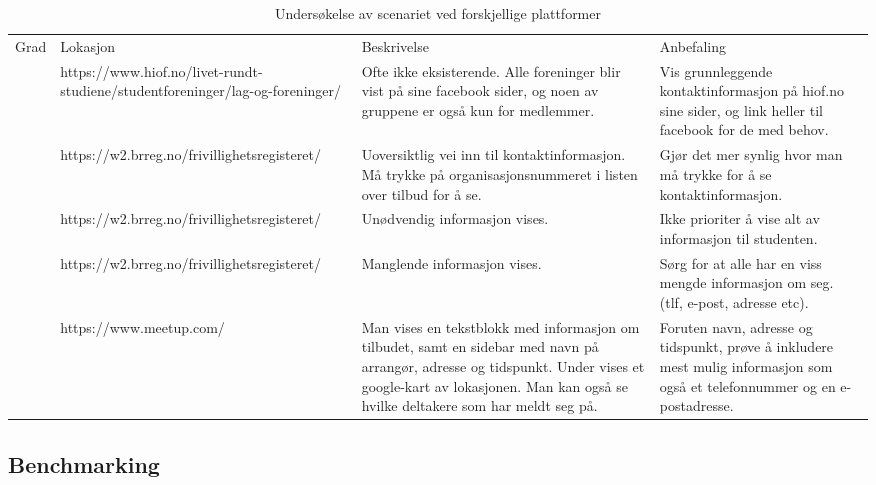 \begin{center}
\begin{table}[H]
\begin{tabular}{ | m{0.7cm} | m{4cm}| m{4cm} | m{4cm} | } 
 \hline
 \centering Grad & Lokasjon & Beskrivelse & Anbefaling \\

 \centering 4 & \tiny https://www.hiof.no/livet-rundt-studiene/studentforeninger/lag-og-foreninger/ & \tiny Ofte ikke eksisterende. Alle foreninger blir vist på sine facebook sider, og noen av gruppene er også kun for medlemmer. & \tiny Vis grunnleggende kontaktinformasjon på hiof.no sine sider, og link heller til facebook for de med behov.  \\
 
 \centering 4 & \tiny https://w2.brreg.no/frivillighetsregisteret/ & \tiny Uoversiktlig vei inn til kontaktinformasjon. Må trykke på organisasjonsnummeret i listen over tilbud for å se. & \tiny Gjør det mer synlig hvor man må trykke for å se kontaktinformasjon. \\
 
 \centering 3 & \tiny https://w2.brreg.no/frivillighetsregisteret/ & \tiny Unødvendig informasjon vises. & \tiny Ikke prioriter å vise alt av informasjon til studenten. \\
 
 \centering 4 & \tiny https://w2.brreg.no/frivillighetsregisteret/ & \tiny Manglende informasjon vises. & \tiny Sørg for at alle har en viss mengde informasjon om seg. (tlf, e-post, adresse etc). \\
 
  \centering 2 & \tiny https://www.meetup.com/ & \tiny Man vises en tekstblokk med informasjon om tilbudet, samt en sidebar med navn på arrangør, adresse og tidspunkt. Under vises et google-kart av lokasjonen. Man kan også se hvilke deltakere som har meldt seg på. & \tiny Foruten navn, adresse og tidspunkt, prøve å inkludere mest mulig informasjon som også et telefonnummer og en e-postadresse. \\
 \hline
\end{tabular}
\caption{Undersøkelse av scenariet  ved forskjellige plattformer}
\label{table:oppsokKontaktinfo}
\end{table}
\end{center}

\subsection{Benchmarking}

